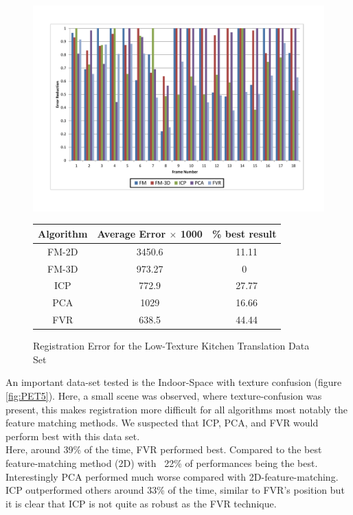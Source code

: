 \begin{figure}
\centering
\includegraphics[width=6in]{images/results/Kitchen_LittleTexture_Pan}
\caption{Registration Error for the Low-Texture Kitchen Translation Data Set}
\label{fig:PET6}

\begin{tabular}{ccc}
\hline
\textbf{Algorithm} & \textbf{Average Error $\times$ 1000} & \textbf{\% best result}\\ \hline
FM-2D	& 3450.6 & ~11.11\\
FM-3D	& 973.27 & 0\\
ICP		& 772.9 & ~27.77\\
PCA		& 1029 & ~16.66\\
FVR		& 638.5 & ~44.44\\
\end{tabular}
\label{tab:PET6ST}
\end{figure} 


An important data-set tested is the Indoor-Space with texture confusion (figure \ref{fig:PET5}). Here, a small scene was observed, where texture-confusion was present, this makes registration more difficult for all algorithms most notably the feature matching methods. We suspected that ICP, PCA, and FVR would perform best with this data set. \\

Here, around 39\% of the time, FVR performed best. Compared to the best feature-matching method (2D) with ~22\% of performances being the best. Interestingly PCA performed much worse compared with 2D-feature-matching. ICP outperformed others around 33\% of the time, similar to FVR's position but it is clear that ICP is not quite as robust as the FVR technique. \\ 

